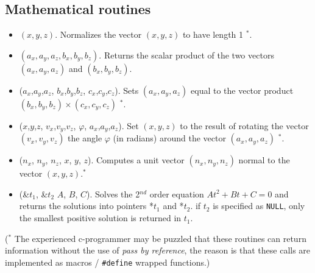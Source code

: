 \subsection{Mathematical routines}
\begin{itemize}
\item {}$(x,y,z)$. Normalizes the vector $(x,y,z)$ to have
  length 1 $^*$.
\item {}$(a_x,a_y,a_z, b_x,b_y,b_z)$. Returns the scalar
  product of the two vectors $(a_x,a_y,a_z)$ and $(b_x,b_y,b_z)$.
\item {}($a_x$,$a_y$,$a_z$, $b_x$,$b_y$,$b_z$, $c_x$,$c_y$,$c_z$). Sets
  $(a_x,a_y,a_z)$ equal to the vector product $(b_x,b_y,b_z) \times
  (c_x,c_y,c_z)$  $^*$.
\item {}($x$,$y$,$z$, $v_x$,$v_y$,$v_z$, $\varphi$, $a_x$,$a_y$,$a_z$). Set
  $(x,y,z)$ to the result of rotating the vector $(v_x,v_y,v_z)$
  the angle $\varphi$ (in radians) around the vector $(a_x,a_y,a_z)$  $^*$.
\item {}($n_x$, $n_y$, $n_z$, $x$, $y$, $z$).
  Computes a unit vector $(n_x, n_y, n_z)$ normal to the vector
  $(x,y,z)$.$^*$
\item {}(\&$t_1$, \&$t_2$ $A$,  $B$,  $C$).
  Solves the 2$^{nd}$ order equation $At^2 + Bt + C = 0$ and returns
  the solutions into pointers *$t_1$ and  *$t_2$. if $t_2$ is
  specified as \verb+NULL+, only the smallest positive solution is
  returned in $t_1$.
\end{itemize}
($^*$ The experienced c-programmer may be puzzled that these routines
can return information without the use of \emph{pass by reference},
the reason is that these calls are implemented as macros /
\verb+#define+ wrapped functions.)

